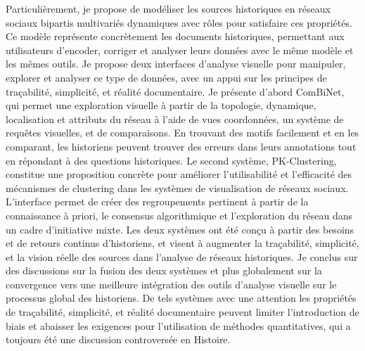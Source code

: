 {    Particulièrement, je propose de modéliser les sources historiques en réseaux sociaux bipartis multivariés dynamiques avec rôles pour satisfaire ces propriétés.
    Ce modèle représente concrètement les documents historiques, permettant aux utilisateurs d'encoder, corriger et analyser leurs données avec le même modèle et les mêmes outils.
    Je propose deux interfaces d'analyse visuelle pour manipuler, explorer et analyser ce type de données, avec un appui sur les principes de traçabilité, simplicité, et réalité documentaire.
    Je présente d'abord ComBiNet, qui permet une exploration visuelle à partir de la topologie, dynamique, localisation et attributs du réseau à l'aide de vues coordonnées, un système de requêtes visuelles, et de comparaisons.
    En trouvant des motifs facilement et en les comparant, les historiens peuvent trouver des erreurs dans leurs annotations tout en répondant à des questions historiques.
    Le second système, PK-Clustering, constitue une proposition concrète pour améliorer l'utilisabilité et l'efficacité des mécanismes de clustering dans les systèmes de visualisation de réseaux sociaux.
    L'interface permet de créer des regroupements pertinent à partir de la connaissance à priori, le consensus algorithmique et l'exploration du réseau dans un cadre d'initiative mixte.
    Les deux systèmes ont été conçu à partir des besoins et de retours continus d'historiens, et visent à augmenter la traçabilité, simplicité, et la vision réelle des sources dans l'analyse de réseaux historiques.
    Je conclus sur des discussions sur la fusion des deux systèmes et plus globalement sur la convergence vers une meilleure intégration des outils d'analyse visuelle sur le processus global des historiens.
    De tels systèmes avec une attention les propriétés de traçabilité, simplicité, et réalité documentaire peuvent limiter l'introduction de biais et abaisser les exigences pour l'utilisation de méthodes quantitatives, qui a toujours été une discussion controversée en Histoire.
}


